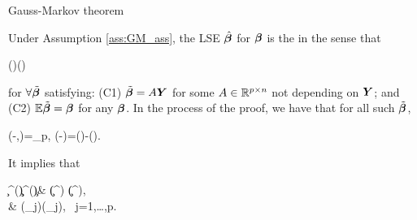 \documentclass[10pt,a4paper]{book}
\begin{document}
\begin{thmbox}{Gauss-Markov theorem}
	\begin{theorem}\label{thm:GM_OLS}
		Under Assumption \ref{ass:GM_ass}, the LSE $\hat{{\boldsymbol\beta}}$ for ${\boldsymbol\beta}$ is the  in the sense that 
		\begin{sequation*}
			\Cov(\tilde{\bab})\succeq\Cov(\hat{\bab})
		\end{sequation*}
		for $\forall \tilde{{\boldsymbol\beta}}$ satisfying: (C1) $\tilde{{\boldsymbol\beta}}=A{\boldsymbol Y}$ for some $A\in\mathbb R^{p\times n}$ not depending on ${\boldsymbol Y}$; and (C2) $\mathbb E\tilde{{\boldsymbol\beta}}={\boldsymbol\beta}$ for any ${\boldsymbol\beta}$.     
		In the process of the proof, we have that for all such $\tilde{{\boldsymbol\beta}}$, 
		\begin{salign*}
			\Cov(\tilde{\bab}-\hat{\bab},\hat{\bab})=\0_p, \qquad \Cov(\tilde{\bab}-\hat{\bab})=\Cov(\tilde{\bab})-\Cov(\hat{\bab}).
		\end{salign*}
	\end{theorem}
\end{thmbox}
It implies that 
\begin{salign*}
	\c^\TT \Cov(\tilde{\bab})\c \geq \c^\TT \Cov(\hat{\bab})\c \quad  \Leftrightarrow \quad & \Var(\c^\TT \tilde{\bab}) \geq \Var(\c^\TT \hat{\bab}),\\
	& \Var(\tilde{\beta}_j)\geq \Var(\hat{\beta}_j), \ j=1,\ldots,p.
\end{salign*}
\end{document}
